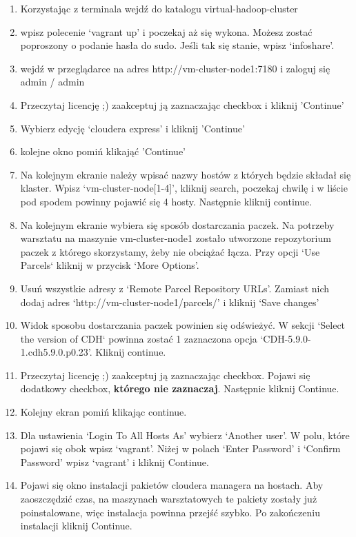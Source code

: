 \documentclass[11pt]{article}
\begin{document}
\begin{enumerate}
\item Korzystając z terminala wejdź do katalogu virtual-hadoop-cluster
\item wpisz polecenie ‘vagrant up’ i poczekaj aż się wykona. Możesz zostać poproszony o podanie hasła do sudo. Jeśli tak się stanie, wpisz ‘infoshare’.
\item wejdź w przeglądarce na adres http://vm-cluster-node1:7180 i zaloguj się admin / admin
\item Przeczytaj licencję ;) zaakceptuj ją zaznaczając checkbox i kliknij 'Continue'
\item Wybierz edycję ‘cloudera express’ i kliknij 'Continue'
\item kolejne okno pomiń klikająć 'Continue'
\item Na kolejnym ekranie należy wpisać nazwy hostów z których będzie składał się klaster. Wpisz ‘vm-cluster-node[1-4]’, kliknij search, poczekaj chwilę i w liście pod spodem powinny pojawić się 4 hosty. Następnie kliknij continue.
\item Na kolejnym ekranie wybiera się sposób dostarczania paczek. Na potrzeby warsztatu na maszynie vm-cluster-node1 zostało utworzone repozytorium paczek z którego skorzystamy, żeby nie obciążać łącza. Przy opcji ‘Use Parcels` kliknij w przycisk ‘More Options’.
\item Usuń wszystkie adresy z ‘Remote Parcel Repository URLs’. Zamiast nich dodaj adres ‘http://vm-cluster-node1/parcels/’ i kliknij ‘Save changes’
\item Widok sposobu dostarczania paczek powinien się odświeżyć. W sekcji ‘Select the version of CDH` powinna zostać 1 zaznaczona opcja ‘CDH-5.9.0-1.cdh5.9.0.p0.23’. Kliknij continue.
\item Przeczytaj licencję ;) zaakceptuj ją zaznaczając checkbox. Pojawi się dodatkowy checkbox, \textbf{którego nie zaznaczaj}. Następnie kliknij Continue.
\item Kolejny ekran pomiń klikając continue.
\item Dla ustawienia ‘Login To All Hosts As’ wybierz ‘Another user’. W polu, które pojawi się obok wpisz ‘vagrant’. Niżej w polach ‘Enter Password’ i ‘Confirm Password’ wpisz ‘vagrant’ i kliknij Continue.
\item Pojawi się okno instalacji pakietów cloudera managera na hostach. Aby zaoszczędzić czas, na maszynach warsztatowych te pakiety zostały już poinstalowane, więc instalacja powinna przejść szybko. Po zakończeniu instalacji kliknij Continue.

\end{enumerate}
\end{document}
